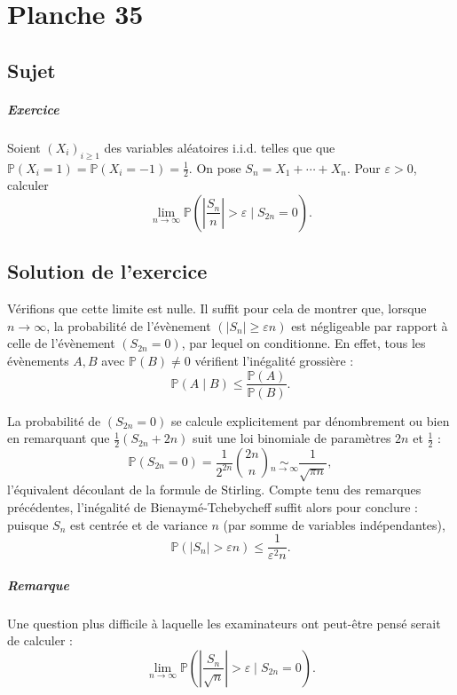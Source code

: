 \chapter{Planche 35}

\section{Sujet}

\paragraph{Exercice}
Soient $(X_i)_{i\geqslant 1}$ des variables aléatoires i.i.d. telles que que $\mathbb P(X_i = 1) = \mathbb P(X_i = -1) = \frac12.$
On pose $S_n = X_1 + \cdots + X_n$.
Pour $\varepsilon > 0$, calculer
\[
\lim_{n\to\infty} \mathbb P\left(\left|\frac{S_n}n\right| > \varepsilon \mid S_{2n} = 0\right).
\]

\section{Solution de l'exercice}
Vérifions que cette limite est nulle.
Il suffit pour cela de montrer que, lorsque $n \to \infty$, la probabilité de l'évènement $(|S_n| \geq \varepsilon n)$ est négligeable par rapport à celle de l'évènement $(S_{2n} = 0)$, par lequel on conditionne. En effet, tous les évènements $A,B$ avec $\mathbb P(B) \neq 0$ vérifient l'inégalité grossière :
\[
\mathbb P(A \mid B) \leqslant \frac{\mathbb P(A)}{\mathbb P(B)}.
\]

La probabilité de $(S_{2n} = 0)$ se calcule explicitement par dénombrement ou bien en remarquant que $\frac12(S_{2n}+{2n})$ suit une loi binomiale de paramètres $2n$ et $\frac12$ :
\[
\mathbb P(S_{2n} = 0) = \frac1{2^{2n}}\binom{2n}{n} \underset{n\to\infty}{\sim} \frac 1{\sqrt{\pi n}},
\]
l'équivalent découlant de la formule de Stirling. Compte tenu des remarques précédentes, l'inégalité de Bienaymé-Tchebycheff suffit alors pour conclure : puisque $S_n$ est centrée et de variance $n$ (par somme de variables indépendantes),
\[
 \mathbb P\left(|S_n| > \varepsilon n\right) \leqslant \frac{1}{\varepsilon^2 n}.
\]

\paragraph{Remarque}
Une question plus difficile à laquelle les examinateurs ont peut-être pensé serait de calculer :
\[
\lim_{n\to\infty} \mathbb P\left(\left|\frac{S_n}{\sqrt n}\right| > \varepsilon \mid S_{2n} = 0\right).
\]

